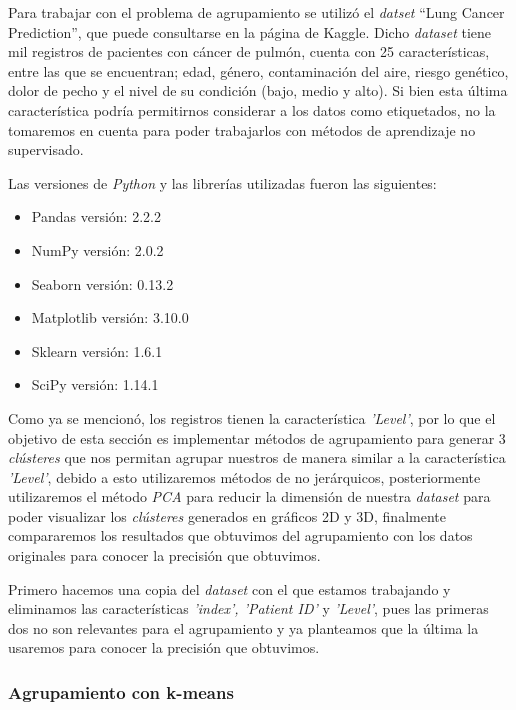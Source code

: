 Para trabajar con el problema de agrupamiento se utilizó el \textit{datset} ``Lung Cancer Prediction'', que puede consultarse en la página de Kaggle. Dicho \textit{dataset} tiene  mil registros de pacientes con cáncer de pulmón, cuenta con  25 características, entre las que se encuentran; edad, género, contaminación del aire, riesgo genético, dolor de pecho y el nivel de su condición (bajo, medio y alto). Si bien esta última característica podría permitirnos considerar a los datos como etiquetados, no la tomaremos en cuenta para poder trabajarlos con métodos de aprendizaje no supervisado. 

Las versiones de \textit{Python} y las librerías utilizadas fueron las siguientes:
\begin{itemize}
	\item  Pandas versión: 2.2.2
	
	\item  NumPy versión: 2.0.2
	
	\item  Seaborn versión: 0.13.2
	
	\item  Matplotlib versión: 3.10.0
	
	\item Sklearn versión: 1.6.1
	
	\item SciPy versión: 1.14.1
\end{itemize}

Como ya se mencionó, los registros tienen la característica \textit{'Level'}, por lo que el objetivo de esta sección es implementar métodos de agrupamiento para generar 3 \textit{clústeres} que nos permitan agrupar nuestros de manera similar a la característica \textit{'Level'}, debido a esto utilizaremos métodos de no jerárquicos, posteriormente utilizaremos el método \textit{PCA} para reducir la dimensión de nuestra \textit{dataset} para poder visualizar los \textit{clústeres} generados en gráficos 2D y 3D, finalmente compararemos los resultados que obtuvimos del agrupamiento con los datos originales para conocer la precisión que obtuvimos.

Primero hacemos una copia del \textit{dataset} con el que estamos trabajando y eliminamos las características \textit{'index', 'Patient ID'} y \textit{'Level'}, pues las primeras dos no son relevantes para el agrupamiento y ya planteamos que la última la usaremos para conocer la precisión que obtuvimos.

\subsubsection{Agrupamiento con k-means}

